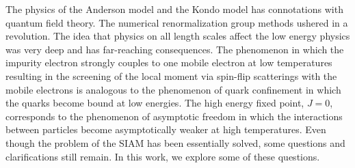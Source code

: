 \documentclass[12pt,twoside]{article}
\numberwithin{equation}{section}
\begin{document}
\pb The physics of the Anderson model and the Kondo model has connotations with quantum field theory. The numerical renormalization group methods ushered in a revolution. The idea that physics on all length scales affect the low energy physics was very deep and has far-reaching consequences. The phenomenon in which the impurity electron strongly couples to one mobile electron at low temperatures resulting in the screening of the local moment via spin-flip scatterings with the mobile electrons is analogous to the phenomenon of quark confinement in which the quarks become bound at low energies. The high energy fixed point, \(J=0\), corresponds to the phenomenon of asymptotic freedom in which the interactions between particles become asymptotically weaker at high temperatures.
\pb Even though the problem of the SIAM has been essentially solved, some questions and clarifications still remain. In this work, we explore some of these questions.
\end{document}
